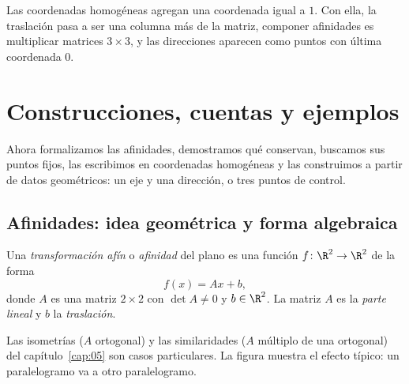 \begin{idea}[Idea]
Las coordenadas homogéneas agregan una coordenada igual a \(1\). Con ella, la traslación pasa
a ser una columna más de la matriz, componer afinidades es multiplicar matrices \(3\times3\),
y las direcciones aparecen como puntos con última coordenada \(0\).
\end{idea}

\section{Construcciones, cuentas y ejemplos}

Ahora formalizamos las afinidades, demostramos qué conservan, buscamos sus puntos fijos, las
escribimos en coordenadas homogéneas y las construimos a partir de datos geométricos: un eje
y una dirección, o tres puntos de control.

{\small\vspace{1mm}\par}

\subsection{Afinidades: idea geométrica y forma algebraica}\label{sec:afinidades-geom}

\begin{definicion}\label{def:06-afinidad}
Una \emph{transformación afín} o \emph{afinidad} del plano es una función
\(f\colon\R^2\to\R^2\) de la forma
\[
  \boxed{f(x)=Ax+b},
\]
donde \(A\) es una matriz \(2\times2\) con \(\det A\neq0\) y \(b\in\R^2\). La matriz \(A\) es
la \emph{parte lineal} y \(b\) la \emph{traslación}.
\end{definicion}

Las isometrías (\(A\) ortogonal) y las similaridades (\(A\) múltiplo de una ortogonal) del
capítulo~\ref{cap:05} son casos particulares. La figura muestra el efecto típico: un
paralelogramo va a otro paralelogramo.

\begin{center}
\end{center}

